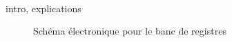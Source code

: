 \paragraph{}{
	intro, explications
}

\begin{figure}
	\label{selec_reg_circ}
	\caption{Sch\'{e}ma \'{e}lectronique pour le banc de registres}
\end{figure}